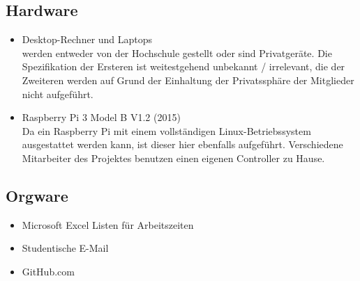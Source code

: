 \subsection{Hardware}

\begin{itemize}
    \item Desktop-Rechner und Laptops \\
    werden entweder von der Hochschule gestellt oder sind Privatger\"ate. Die Spezifikation der Ersteren ist weitestgehend unbekannt / irrelevant, die der Zweiteren werden auf Grund der Einhaltung der Privatssph\"are der Mitglieder nicht aufgef\"uhrt.
    \item Raspberry Pi 3 Model B V1.2 (2015) \\
    Da ein Raspberry Pi mit einem vollst\"andigen Linux-Betriebssystem ausgestattet werden kann, ist dieser hier ebenfalls aufgef\"uhrt. Verschiedene Mitarbeiter des Projektes benutzen einen eigenen Controller zu Hause.
\end{itemize}

\subsection{Orgware}

\begin{itemize}
    \item Microsoft Excel Listen f\"ur Arbeitszeiten
    \item Studentische E-Mail
    \item GitHub.com
\end{itemize}

